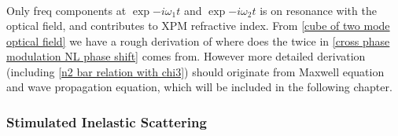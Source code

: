 \documentclass[12pt]{extarticle}
\numberwithin{equation}{section}
\numberwithin{figure}{section}
\numberwithin{table}{section}
\newcommand{\<}{\langle}
\renewcommand{\>}{\rangle}
\theoremstyle{definition}
\begin{document}
\begin{itemize}
\begin{equation}
\begin{split}
                    \end{split}
                    \label{cube of two mode optical field}
                \end{equation}
                Only freq components at $\exp{-i\omega_1t}$ and $\exp{-i\omega_2t}$ is on resonance with the optical field, and contributes to XPM refractive index. From \autoref{cube of two mode optical field} we have a rough derivation of where does the twice in \autoref{cross phase modulation NL phase shift} comes from. However more detailed derivation (including \autoref{n2 bar relation with chi3}) should originate from Maxwell equation and wave propagation equation, which will be included in the following chapter.
            \end{itemize}
        \subsubsection{Stimulated Inelastic Scattering}
\end{document}
